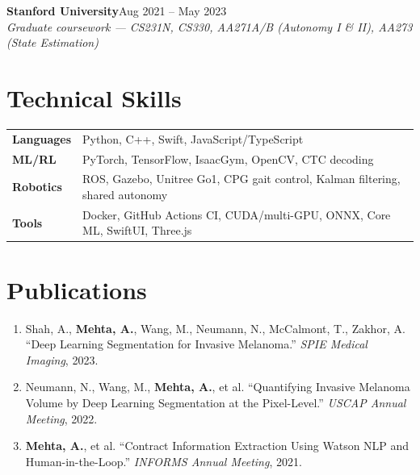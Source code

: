 \documentclass[10pt]{article}
\newcommand{\role}[4]{\par\vspace{5pt}\textbf{#1}\hfill#2\\\textit{#3}\hfill\textit{#4}\par}
\begin{document}
\role{Stanford University}{Aug 2021 -- May 2023}{Graduate coursework --- CS231N, CS330, AA271A/B (Autonomy I \& II), AA273 (State Estimation)}{}

\section*{Technical Skills}
\begin{tabular}{@{}p{0.9in}l}
\textbf{Languages} & Python, C++, Swift, JavaScript/TypeScript \\
\textbf{ML/RL} & PyTorch, TensorFlow, IsaacGym, OpenCV, CTC decoding \\
\textbf{Robotics} & ROS, Gazebo, Unitree Go1, CPG gait control, Kalman filtering, shared autonomy \\
\textbf{Tools} & Docker, GitHub Actions CI, CUDA/multi-GPU, ONNX, Core ML, SwiftUI, Three.js \\
\end{tabular}

\section*{Publications}
\begin{enumerate}[leftmargin=1.4em,itemsep=1pt,topsep=1pt]
\item Shah, A., \textbf{Mehta, A.}, Wang, M., Neumann, N., McCalmont, T., Zakhor, A. ``Deep Learning Segmentation for Invasive Melanoma.'' \textit{SPIE Medical Imaging}, 2023.
\item Neumann, N., Wang, M., \textbf{Mehta, A.}, et al. ``Quantifying Invasive Melanoma Volume by Deep Learning Segmentation at the Pixel-Level.'' \textit{USCAP Annual Meeting}, 2022.
\item \textbf{Mehta, A.}, et al. ``Contract Information Extraction Using Watson NLP and Human-in-the-Loop.'' \textit{INFORMS Annual Meeting}, 2021.
\end{enumerate}
\end{document}
